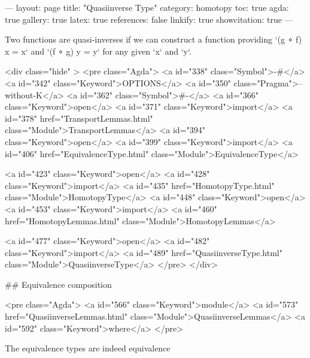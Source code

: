 ---
layout: page
title: "Quasiinverse Type"
category: homotopy
toc: true
agda: true
gallery: true
latex: true
references: false
linkify: true
showcitation: true
---

Two functions are quasi-inverses if we can construct a function providing
`(g ∘ f) x = x` and `(f ∘ g) y = y` for any given `x` and `y`.

<div class="hide" >
<pre class="Agda">
<a id="338" class="Symbol">{-#</a> <a id="342" class="Keyword">OPTIONS</a> <a id="350" class="Pragma">--without-K</a> <a id="362" class="Symbol">#-}</a>
<a id="366" class="Keyword">open</a> <a id="371" class="Keyword">import</a> <a id="378" href="TransportLemmas.html" class="Module">TransportLemmas</a>
<a id="394" class="Keyword">open</a> <a id="399" class="Keyword">import</a> <a id="406" href="EquivalenceType.html" class="Module">EquivalenceType</a>

<a id="423" class="Keyword">open</a> <a id="428" class="Keyword">import</a> <a id="435" href="HomotopyType.html" class="Module">HomotopyType</a>
<a id="448" class="Keyword">open</a> <a id="453" class="Keyword">import</a> <a id="460" href="HomotopyLemmas.html" class="Module">HomotopyLemmas</a>


<a id="477" class="Keyword">open</a> <a id="482" class="Keyword">import</a> <a id="489" href="QuasiinverseType.html" class="Module">QuasiinverseType</a>
</pre>
</div>

## Equivalence composition

<pre class="Agda">
<a id="566" class="Keyword">module</a> <a id="573" href="QuasiinverseLemmas.html" class="Module">QuasiinverseLemmas</a> <a id="592" class="Keyword">where</a>
</pre>

The equivalence types are indeed equivalence

